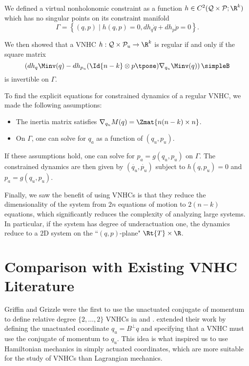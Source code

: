 We defined a virtual nonholonomic
constraint as a function 
\(h \in C^2(\mathcal{Q}\times\mathcal{P}; \R^k)\) 
which has no singular points on its constraint manifold
\[
    \Gamma = \left\{(q,p) \mid h(q,p) = 0, dh_q \dot{q} + dh_p \dot{p} = 0\right\}
    .
\]

We then showed that a VNHC 
\(h : \mathcal{Q} \times \mathcal{P}_u \rightarrow \R^k\) is regular if and only
if the square matrix
\[
    \left(
    dh_q \Minv(q) - 
    dh_{p_u} (\Id{n-k} \otimes p\tpose)\nabla_{q_u}\Minv(q) 
    \right)
    \simpleB
\]
is invertible on \(\Gamma\).

To find the explicit equations for constrained dynamics of a regular VNHC, 
we made the following assumptions:
\begin{itemize}
    \item The inertia matrix satisfies 
        \(\nabla_{q_u}M(q) = \Zmat{n(n-k) \times n}\).
    \item On \(\Gamma\), one can solve for \(q_a\) as a function of
        \((q_u,p_u)\).
\end{itemize}
If these assumptions hold, one can solve for \(p_a = g(q_u,p_u)\) on \(\Gamma\).
The constrained dynamics are then given by
\((\dot{q_u}, \dot{p_u})\) subject to \(h(q,p_u) = 0\) and \(p_a = g(q_u,p_u)\).

Finally, we saw the benefit of using VNHCs is that they reduce the
dimensionality of the system from \(2n\) equations of motion to \(2(n-k)\)
equations, which significantly reduces the complexity of analyzing large systems.
In particular, if the system has degree of underactuation one, the dynamics
reduce to a \(2\)D system on the ``\((q,p)\)-plane" \(\Rt{T}\times\R\).

\section{Comparison with Existing VNHC Literature}\label{ch:vnhc-compare}

Griffin and Grizzle were the first to use the unactuated conjugate of momentum
to define relative degree \(\{2,\ldots,2\}\) VNHCs in
\cite{nhvc_dynamic_walking} and \cite{nhvc_gait_optimization}.
\citet{hybrid_zero_dynamics_bipedal_nhvcs} extended their work by defining
the unactuated coordinate \(q_u = B^\perp q\) and specifying that a
VNHC must use the conjugate of momentum to \(q_u\).
This idea is what inspired us to use Hamiltonian mechanics in simply actuated
coordinates, which are more suitable for the study of VNHCs than
Lagrangian mechanics. 


